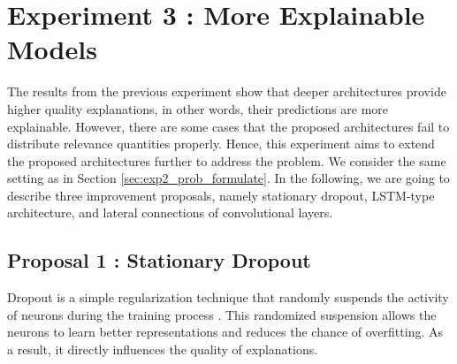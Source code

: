\section{Experiment 3 : More Explainable Models}
The results from the previous experiment show that deeper architectures provide higher quality explanations, in other words, their predictions are more explainable. However, there are some cases that the proposed architectures fail to distribute relevance quantities properly.  Hence, this experiment aims to extend the proposed architectures further to address the problem. We consider the same setting as in Section \ref{sec:exp2_prob_formulate}. In the following, we are going to describe three improvement proposals, namely stationary dropout, LSTM-type architecture,  and lateral connections of convolutional layers.


\subsection{Proposal 1 :  Stationary Dropout}
Dropout is a simple regularization technique that randomly suspends the activity of neurons during the training process \citep{SrivastavaDropoutSimpleWay2014} . This randomized suspension allows the neurons to learn better representations and reduces the chance of overfitting.  As a result, it directly influences the quality of explanations.





\begin{figure}[!htb]
\centering
{} 

\label{fig:dropout_lstm}
\end{figure}

